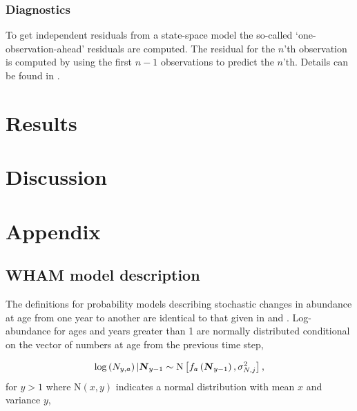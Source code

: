 \documentclass[12pt,letterpaper, leqno]{article}
\begin{document}
\subsubsection*{Diagnostics}

To get independent residuals from a state-space model the so-called `one-observation-ahead' residuals are computed. The residual for the $n$'th observation is computed by using the first $n-1$ observations to predict the $n$'th. Details can be found in \citet{thygesen2017validation}.   

\section*{Results}

\section*{Discussion}

\clearpage





\clearpage

\section*{Appendix}

\subsection*{WHAM model description}

The definitions for probability models describing stochastic changes in abundance at age from one year to another are identical to that given in \citet{milleretal16} and \citet{millerhyun18}. Log-abundance for ages and years greater than 1 are normally distributed conditional on the vector of numbers at age from the previous
time step,

\vspace{-12pt}
\begin{equation*}
\log\left( N_{y,a}\right) | \textbf{\textsl{N}}_{y-1} \sim \text{N}\left[f_a\left(\textbf{\textsl{N}}_{y-1}\right), \sigma_{N,j}^2\right],
\end{equation*}
for $y>1$ where $\text{N}(x,y)$ indicates a normal distribution with mean $x$ and variance $y$,
\end{document}
